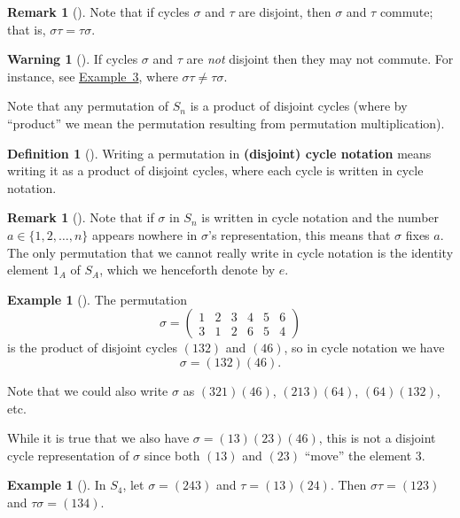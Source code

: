 \documentclass[10pt,]{book}
\newcommand{\terminology}[1]{\textbf{#1}}
\theoremstyle{plain}
\theoremstyle{definition}
\newtheorem{definition}[theorem]{Definition}
\theoremstyle{definition}
\newtheorem{remark}[theorem]{Remark}
\newtheorem{warning}[theorem]{Warning}
\theoremstyle{definition}
\newtheorem{example}[theorem]{Example}
\theoremstyle{definition}
\numberwithin{equation}{section}
\newcommand{\amp}{&}
\begin{document}
\begin{remark}[]\label{remark-27}
Note that if cycles \(\sigma\) and \(\tau\) are disjoint, then \(\sigma\) and \(\tau\) commute; that is, \(\sigma \tau=\tau \sigma\).%
\end{remark}
\begin{warning}[]\label{warning-17}
If cycles \(\sigma\) and \(\tau\) are \emph{not} disjoint then they may not commute. For instance, see \hyperref[nocommute]{Example~3}, where \(\sigma\tau \neq \tau \sigma\).%
\end{warning}
Note that any permutation of \(S_n\) is a product of disjoint cycles (where by ``product'' we mean the permutation resulting from permutation multiplication).%
\begin{definition}[{}]\label{definition-49}
Writing a permutation in \terminology{(disjoint) cycle notation} means writing it as a product of disjoint cycles, where each cycle is written in cycle notation.%
\end{definition}
\begin{remark}[]\label{remark-28}
Note that if \(\sigma\) in \(S_n\) is written in cycle notation and the number \(a\in \{1,2,\ldots, n\}\) appears nowhere in \(\sigma\)'s representation, this means that \(\sigma\) fixes \(a\). The only permutation that we cannot really write in cycle notation is the identity element \(1_A\) of \(S_A\), which we henceforth denote by \(e\).%
\end{remark}
\begin{example}[]\label{example-53}
The permutation%
\begin{equation*}
\sigma =\begin{pmatrix}1\amp 2\amp 3\amp 4\amp 5\amp 6\\ 3\amp 1\amp 2\amp 6\amp 5\amp 4
\end{pmatrix}
\end{equation*}
is the product of disjoint cycles \((132)\) and \((46)\), so in cycle notation we have%
\begin{equation*}
\sigma=(132)(46).
\end{equation*}
%
\par
Note that we could also write \(\sigma\) as \((321)(46)\), \((213)(64)\), \((64)(132)\), etc.%
\par
While it is true that we also have \(\sigma=(13)(23)(46)\), this is not a disjoint cycle representation of \(\sigma\) since both \((13)\) and \((23)\) ``move'' the element \(3\).%
\end{example}
\begin{example}[]\label{example-54}
In \(S_4\), let \(\sigma=(243)\) and \(\tau=(13)(24)\). Then \(\sigma \tau=(123)\) and \(\tau \sigma = (134).\)%
\end{example}
\end{document}
